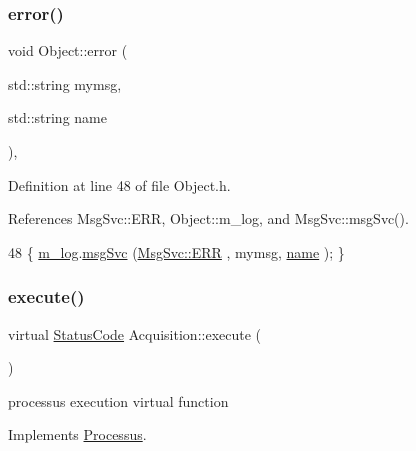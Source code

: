 \subsubsection{\texorpdfstring{error()}{error()}\hspace{0.1cm}{\footnotesize\ttfamily [2/2]}}
{\footnotesize\ttfamily void Object\+::error (\begin{DoxyParamCaption}\item[{std\+::string}]{mymsg,  }\item[{std\+::string}]{name }\end{DoxyParamCaption})\hspace{0.3cm}{\ttfamily [inline]}, {\ttfamily [inherited]}}



Definition at line 48 of file Object.\+h.



References Msg\+Svc\+::\+E\+RR, Object\+::m\+\_\+log, and Msg\+Svc\+::msg\+Svc().


\begin{DoxyCode}
48 \{ \hyperlink{classObject_a0d269813dd7ac1f24bc143031e2963f2}{m\_log}.\hyperlink{classMsgSvc_ad25f18047920cc59a314e5098259711c}{msgSvc} (\hyperlink{classMsgSvc_ae671eb7301996cd049d2da8a65925926a35a9d7166e9896af4ec8fb33bf5f1772}{MsgSvc::ERR}     , mymsg, \hyperlink{classObject_a300f4c05dd468c7bb8b3c968868443c1}{name} ); \}
\end{DoxyCode}
\mbox{\label{classAcquisition_a6cae797f591c2c576ebf17411e5212c9}} 
\subsubsection{\texorpdfstring{execute()}{execute()}\hspace{0.1cm}{\footnotesize\ttfamily [1/2]}}
{\footnotesize\ttfamily virtual \hyperlink{classStatusCode}{Status\+Code} Acquisition\+::execute (\begin{DoxyParamCaption}{ }\end{DoxyParamCaption})\hspace{0.3cm}{\ttfamily [virtual]}}

processus execution virtual function 

Implements \hyperlink{classProcessus_a63767a63a1fb0055c5aa45b21a4a5d58}{Processus}.

\mbox{\label{classAcquisition_ae3b63064bee1b042914b63ae4135cbd8}} 

